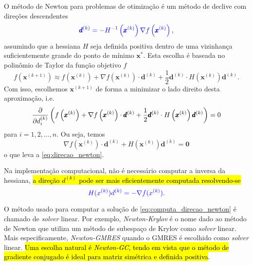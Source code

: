 O método de Newton{\newton} para problemas de otimização é um método de declive com direções descendentes
\begin{equation}\color{blue}\label{eq:direcao_newton}
  \pmb{d}^{(k)} = -H^{-1}\left(\pmb{x}^{(k)}\right)\nabla f\left(\pmb{x}^{(k)}\right),
\end{equation}
assumindo que a hessiana $H$ seja definida positiva dentro de uma vizinhança suficientemente grande do ponto de mínimo $\pmb{x}^*$. Esta escolha é baseada no polinômio de Taylor da função objetivo $f$
\begin{equation}
  f\left(\pmb{x}^{(k+1)}\right) \approx f\left(\pmb{x}^{(k)}\right) + \nabla f\left(\pmb{x}^{(k)}\right)\cdot \pmb{d}^{(k)} + \frac{1}{2}\pmb{d}^{(k)}\cdot H\left(\pmb{x}^{(k)}\right)\pmb{d}^{(k)}.
\end{equation}
Com isso, escolhemos $\pmb{x}^{(k+1)}$ de forma a minimizar o lado direito desta aproximação, i.e.
\begin{equation}
  \frac{\partial}{\partial d_i^{(k)}}\left(f\left(\pmb{x}^{(k)}\right) + \nabla f\left(\pmb{x}^{(k)}\right)\cdot \pmb{d}^{(k)} + \frac{1}{2}\pmb{d}^{(k)}\cdot H\left(\pmb{x}^{(k)}\right)\pmb{d}^{(k)}\right) = 0
\end{equation}
para $i = 1, 2, \dotsc, n$. Ou seja, temos
\begin{equation}
  \nabla f\left(\pmb{x}^{(k)}\right)\cdot \pmb{d}^{(k)} + H\left(\pmb{x}^{(k)}\right)\pmb{d}^{(k)} = \pmb{0}
\end{equation}
o que leva a \eqref{eq:direcao_newton}.

\begin{obs}
  Na implementação computacional, não é necessário computar a inversa da hessiana, \hl{a direção $d^{(k)}$ pode ser mais eficientemente computada resolvendo-se}
  \begin{equation}\color{blue}\label{eq:computa_direcao_newton}
    H(x^{(k)})d^{(k)} = -\nabla f(x^{(k)}).
  \end{equation}
\end{obs}

\begin{obs}
  O método usado para computar a solução de \eqref{eq:computa_direcao_newton} é chamado de {\it solver} linear. Por exemplo, \emph{Newton-Krylov}{\krylov} é o nome dado ao método de Newton que utiliza um método de subespaço de Krylov como {\it solver} linear. Mais especificamente, \emph{Newton-GMRES} quando o GMRES é escolhido como \textit{solver} linear. \hl{Uma escolha natural é \emph{Newton-GC}, tendo em vista que o método de gradiente conjugado é ideal para matriz simétrica e definida positiva}.
\end{obs}


